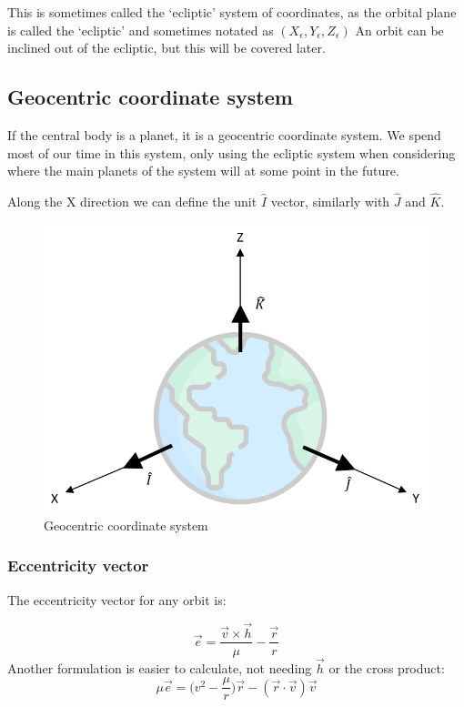 \documentclass{report}
\begin{document}
This is sometimes called the `ecliptic' system of coordinates, as the orbital plane is called the `ecliptic' and sometimes notated as $(X_{\epsilon},Y_{\epsilon},Z_{\epsilon})$ An orbit can be inclined out of the ecliptic, but this will be covered later.

\subsection{Geocentric coordinate system}
If the central body is a planet, it is a geocentric coordinate system. We spend most of our time in this system, only using the ecliptic system when considering where the main planets of the system will at some point in the future.

Along the X direction we can define the unit $\hat{I}$ vector, similarly with $\hat{J}$ and $\hat{K}$.

\begin{figure}[H]
    \centering
    \includegraphics[width=0.5\linewidth]{Latex Images/Geocentric.png}
    \caption{Geocentric coordinate system}
    \label{fig:geocentric}
\end{figure}



\subsubsection{Eccentricity vector}
The eccentricity vector for any orbit is:

$$
\vec{e} = \frac{\vec{v} \times \vec{h}}{\mu}-\frac{\vec{r}}{r}
$$
Another formulation is easier to calculate, not needing $\vec{h}$ or the cross product:
$$
\mu \vec{e} = \bigg(v^2-\frac{\mu}{r}\bigg)\vec{r}-(\vec{r}\cdot\vec{v})\vec{v}
$$
\end{document}
